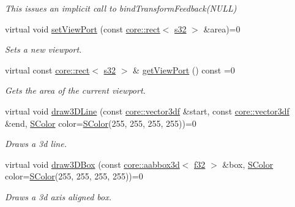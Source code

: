 \begin{DoxyCompactItemize}
\begin{DoxyCompactList}\small\item\em This issues an implicit call to bind\+Transform\+Feedback(\+N\+U\+L\+L) \end{DoxyCompactList}\item 
virtual void \hyperlink{classirr_1_1video_1_1IVideoDriver_af03cf9b67bb7b43a8021bbe4baa78a08}{set\+View\+Port} (const \hyperlink{classirr_1_1core_1_1rect}{core\+::rect}$<$ \hyperlink{namespaceirr_ac66849b7a6ed16e30ebede579f9b47c6}{s32} $>$ \&area)=0
\begin{DoxyCompactList}\small\item\em Sets a new viewport. \end{DoxyCompactList}\item 
virtual const \hyperlink{classirr_1_1core_1_1rect}{core\+::rect}$<$ \hyperlink{namespaceirr_ac66849b7a6ed16e30ebede579f9b47c6}{s32} $>$ \& \hyperlink{classirr_1_1video_1_1IVideoDriver_aaf6c38991ee735a26acf0c70ffa463e6}{get\+View\+Port} () const  =0
\begin{DoxyCompactList}\small\item\em Gets the area of the current viewport. \end{DoxyCompactList}\item 
virtual void \hyperlink{classirr_1_1video_1_1IVideoDriver_a5e4e03dca1720f3d2019b73a4eebb5e6}{draw3\+D\+Line} (const \hyperlink{namespaceirr_1_1core_a06f169d08b5c429f5575acb7edbad811}{core\+::vector3df} \&start, const \hyperlink{namespaceirr_1_1core_a06f169d08b5c429f5575acb7edbad811}{core\+::vector3df} \&end, \hyperlink{classirr_1_1video_1_1SColor}{S\+Color} color=\hyperlink{classirr_1_1video_1_1SColor}{S\+Color}(255, 255, 255, 255))=0
\begin{DoxyCompactList}\small\item\em Draws a 3d line. \end{DoxyCompactList}\item 
virtual void \hyperlink{classirr_1_1video_1_1IVideoDriver_a7773fce9358ee81db5484b2d21015570}{draw3\+D\+Box} (const \hyperlink{classirr_1_1core_1_1aabbox3d}{core\+::aabbox3d}$<$ \hyperlink{namespaceirr_a0277be98d67dc26ff93b1a6a1d086b07}{f32} $>$ \&box, \hyperlink{classirr_1_1video_1_1SColor}{S\+Color} color=\hyperlink{classirr_1_1video_1_1SColor}{S\+Color}(255, 255, 255, 255))=0
\begin{DoxyCompactList}\small\item\em Draws a 3d axis aligned box. \end{DoxyCompactList}\item 

\end{DoxyCompactItemize}
